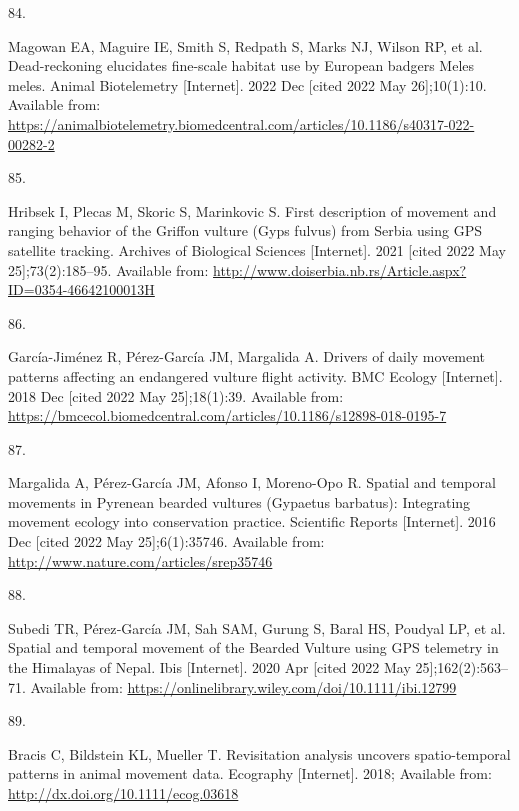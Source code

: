 \documentclass[10pt,a4paper]{article}
\newlength{\cslhangindent}
\newlength{\csllabelwidth}
\newlength{\cslentryspacingunit} %
\newenvironment{CSLReferences}[2] %
 {%
  \setlength{\parindent}{0pt}
  \ifodd #1
  \let\oldpar\par
  \def\par{\hangindent=\cslhangindent\oldpar}
  \fi
  \setlength{\parskip}{#2\cslentryspacingunit}
 }%
 {}
\newcommand{\CSLLeftMargin}[1]{\parbox[t]{\csllabelwidth}{#1}}
\newcommand{\CSLRightInline}[1]{\parbox[t]{\linewidth - \csllabelwidth}{#1}\break}
\begin{document}
\begin{CSLReferences}{0}{0}
\leavevmode{}%
\CSLLeftMargin{84. }
\CSLRightInline{Magowan EA, Maguire IE, Smith S, Redpath S, Marks NJ, Wilson RP, et al. Dead-reckoning elucidates fine-scale habitat use by {European} badgers {Meles} meles. Animal Biotelemetry {[}Internet{]}. 2022 Dec {[}cited 2022 May 26{]};10(1):10. Available from: \url{https://animalbiotelemetry.biomedcentral.com/articles/10.1186/s40317-022-00282-2}}

\leavevmode{}%
\CSLLeftMargin{85. }
\CSLRightInline{Hribsek I, Plecas M, Skoric S, Marinkovic S. First description of movement and ranging behavior of the {Griffon} vulture ({Gyps} fulvus) from {Serbia} using {GPS} satellite tracking. Archives of Biological Sciences {[}Internet{]}. 2021 {[}cited 2022 May 25{]};73(2):185--95. Available from: \url{http://www.doiserbia.nb.rs/Article.aspx?ID=0354-46642100013H}}

\leavevmode{}%
\CSLLeftMargin{86. }
\CSLRightInline{García-Jiménez R, Pérez-García JM, Margalida A. Drivers of daily movement patterns affecting an endangered vulture flight activity. BMC Ecology {[}Internet{]}. 2018 Dec {[}cited 2022 May 25{]};18(1):39. Available from: \url{https://bmcecol.biomedcentral.com/articles/10.1186/s12898-018-0195-7}}

\leavevmode{}%
\CSLLeftMargin{87. }
\CSLRightInline{Margalida A, Pérez-García JM, Afonso I, Moreno-Opo R. Spatial and temporal movements in {Pyrenean} bearded vultures ({Gypaetus} barbatus): {Integrating} movement ecology into conservation practice. Scientific Reports {[}Internet{]}. 2016 Dec {[}cited 2022 May 25{]};6(1):35746. Available from: \url{http://www.nature.com/articles/srep35746}}

\leavevmode{}%
\CSLLeftMargin{88. }
\CSLRightInline{Subedi TR, Pérez‐García JM, Sah SAM, Gurung S, Baral HS, Poudyal LP, et al. Spatial and temporal movement of the {Bearded} {Vulture} using {GPS} telemetry in the {Himalayas} of {Nepal}. Ibis {[}Internet{]}. 2020 Apr {[}cited 2022 May 25{]};162(2):563--71. Available from: \url{https://onlinelibrary.wiley.com/doi/10.1111/ibi.12799}}

\leavevmode{}%
\CSLLeftMargin{89. }
\CSLRightInline{Bracis C, Bildstein KL, Mueller T. Revisitation analysis uncovers spatio-temporal patterns in animal movement data. Ecography {[}Internet{]}. 2018; Available from: \url{http://dx.doi.org/10.1111/ecog.03618}}


\end{CSLReferences}
\end{document}
